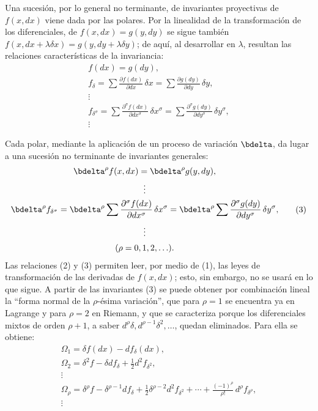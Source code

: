 Una sucesión, por lo general no terminante, de invariantes proyectivas de
\(f(x,dx)\) viene dada por las polares. Por la linealidad de la transformación
de los diferenciales, de \(f(x,dx)=g(y,dy)\) se sigue también
\(f(x,dx+\lambda\delta x)=g(y,dy+\lambda\delta y)\); de aquí, al desarrollar
en \(\lambda\), resultan las relaciones características de la invariancia:
\begin{equation}
\begin{gathered}
f(dx)=g(dy),\\
f_\delta=\sum\frac{\partial f(dx)}{\partial dx}\,\delta x
       =\sum\frac{\partial g(dy)}{\partial dy}\,\delta y,\\
\vdots\\
f_{\delta^\sigma}=
\sum\frac{\partial^\sigma f(dx)}{\partial dx^\sigma}\,\delta x^\sigma
=
\sum\frac{\partial^\sigma g(dy)}{\partial dy^\sigma}\,\delta y^\sigma,\\
\vdots
\end{gathered}
\tag{2}
\end{equation}

Cada polar, mediante la aplicación de un proceso de variación \(\bdelta\), da
lugar a una sucesión no terminante de invariantes generales:
\begin{equation}
\begin{gathered}
\bdelta^\rho f(x,dx)=\bdelta^\rho g(y,dy),\\
\vdots\\
\bdelta^\rho f_{\delta^\sigma}
=\bdelta^\rho\sum\frac{\partial^\sigma f(dx)}{\partial dx^\sigma}\,
\delta x^\sigma
=\bdelta^\rho\sum\frac{\partial^\sigma g(dy)}{\partial dy^\sigma}\,
\delta y^\sigma,\\
\vdots\\[0.2em]
(\rho=0,1,2,\ldots).
\end{gathered}
\tag{3}
\end{equation}
Las relaciones (2) y (3) permiten leer, por medio de (1), las leyes de
transformación de las derivadas de \(f(x,dx)\); esto, sin embargo, no se usará
en lo que sigue. A partir de las invariantes (3) se puede obtener por
combinación lineal la ``forma normal de la \(\rho\)-ésima variación'', que para
\(\rho=1\) se encuentra ya en Lagrange y para \(\rho=2\) en Riemann, y que se
caracteriza porque los diferenciales mixtos de orden \(\rho+1\), a saber
\(d^\rho\delta,d^{\rho-1}\delta^2,\ldots\), quedan eliminados. Para ella se
obtiene:
\begin{equation}
\begin{gathered}
\Omega_1=\delta f(dx)-d f_\delta(dx),\\
\Omega_2=\delta^2 f-\delta d f_\delta+\frac12 d^2 f_{\delta^2},\\
\vdots\\
\Omega_\rho=\delta^\rho f-\delta^{\rho-1}d f_\delta
+\frac12\delta^{\rho-2}d^2 f_{\delta^2}
+\cdots+\frac{(-1)^\rho}{\rho!}\,d^\rho f_{\delta^\rho},\\
\vdots
\end{gathered}
\tag{4}
\end{equation}

